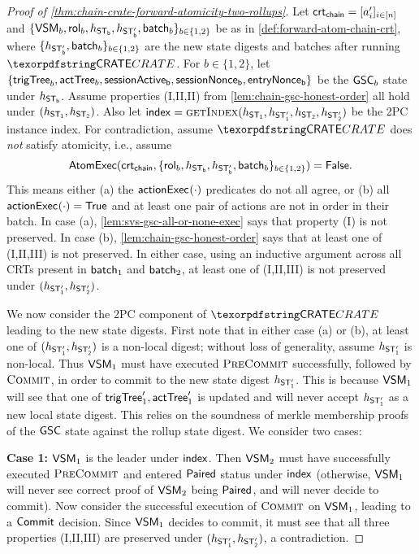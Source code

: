 \begin{proof}[Proof of \cref{thm:chain-crate-forward-atomicity-two-rollups}]
    Let $\mathsf{crt_{chain}} = [a_i']_{i \in [n]}$ and $\{\mathsf{VSM}_{b}, \mathsf{rol}_{b}, h_{\mathsf{ST_{b}}}, h_{\mathsf{ST_{b}'}}, \mathsf{batch}_{b}\}_{b \in \{1,2\}}$ be as in \cref{def:forward-atom-chain-crt}, where $\{h_{\mathsf{ST_{b}'}}, \mathsf{batch}_{b}\}_{b \in \{1,2\}}$ are the new state digests and batches after running $\pname$. For $b \in \{1,2\}$, let $\{\mathsf{trigTree}_b, \mathsf{actTree}_b, \mathsf{sessionActive_{b}}, \mathsf{sessionNonce_{b}}, \\ \mathsf{entryNonce_{b}} \}$ be the $\mathsf{GSC}_b$ state under $h_{\mathsf{ST_{b}}}$.
    Assume properties (I,II,II) from \cref{lem:chain-gsc-honest-order} all hold under $(h_{\mathsf{ST_{1}}}, h_{\mathsf{ST_{2}}})$.
    Also let $\idx = \textproc{getIndex}(\dst{1}, \dstt{1}, \dst{2}, \dstt{2})$ be the 2PC instance index.
    For contradiction, assume $\pname$ does \emph{not} satisfy atomicity, i.e., assume
    \begin{align*}
        \mathsf{AtomExec}(\mathsf{crt_{chain}}, \{\mathsf{rol}_{b}, h_{\mathsf{ST_{b}}}, h_{\mathsf{ST_{b}'}}, \mathsf{batch}_{b}\}_{b \in \{1,2\}}) = \mathsf{False}.
    \end{align*}
    This means either (a) the $\mathsf{actionExec}_{}(\cdot)$ predicates do not all agree, or (b) all $\mathsf{actionExec}_{}(\cdot) = \mathsf{True}$ and at least one pair of actions are not in order in their batch. In case (a), \cref{lem:svs-gsc-all-or-none-exec} says that property (I) is not preserved. In case (b), \cref{lem:chain-gsc-honest-order} says that at least one of (I,II,III) is not preserved. 
    In either case, using an inductive argument across all CRTs present in $\mathsf{batch}_{1}$ and $\mathsf{batch}_{2}$, at least one of (I,II,III) is not preserved under $(h_{\mathsf{ST_{1}'}}, h_{\mathsf{ST_{2}'}})$.
    
    \smallskip
    We now consider the 2PC component of $\pname$ leading to the new state digests. First note that in either case (a) or (b), at least one of $(h_{\mathsf{ST_{1}'}}, h_{\mathsf{ST_{2}'}})$ is a non-local digest; without loss of generality, assume $h_{\mathsf{ST_{1}'}}$ is non-local. Thus $\mathsf{VSM}_{1}$ must have executed $\textproc{PreCommit}$ successfully, followed by $\textproc{Commit}$, in order to commit to the new state digest $h_{\mathsf{ST_{1}'}}$. This is because $\mathsf{VSM}_{1}$ will see that one of $\mathsf{trigTree}_1', \mathsf{actTree}_1'$ is updated and will never accept $h_{\mathsf{ST_{1}'}}$ as a new local state digest. This relies on the soundness of merkle membership proofs of the $\mathsf{GSC}$ state against the rollup state digest. We consider two cases:
    
   \noindent\textbf{Case 1:} $\mathsf{VSM}_{1}$ is the leader under $\mathsf{index}$. Then $\mathsf{VSM}_{2}$ must have successfully  executed $\textproc{PreCommit}$ and entered $\mathsf{Paired}$ status under $\mathsf{index}$ 
    (otherwise, $\mathsf{VSM}_{1}$ will never see correct proof of $\mathsf{VSM}_{2}$ being $\mathsf{Paired}$, and will never decide to commit). Now consider the successful execution of $\textproc{Commit}$ on $\mathsf{VSM}_{1}$, 
    leading to a $\mathsf{Commit}$ decision. Since $\mathsf{VSM}_{1}$ decides to commit, it must see that all three properties (I,II,III) are preserved under $(h_{\mathsf{ST_{1}'}}, h_{\mathsf{ST_{2}'}})$, a contradiction. 


\end{proof}
